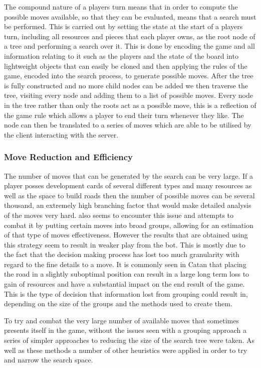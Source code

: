 \documentclass[]{article}
\begin{document}
\par The compound nature of a players turn means that in order to compute the possible moves available, so that they can be evaluated, means that a search must be performed. This is carried out by setting the state at the start of a players turn, including all resources and pieces that each player owns, as the root node of a tree and performing a search over it. This is done by encoding the game and all information relating to it such as the players and the state of the board into lightweight objects that can easily be cloned and then applying the rules of the game, encoded into the search process, to generate possible moves. After the tree is fully constructed and no more child nodes can be added we then traverse the tree, visiting every node and adding them to a list of possible moves. Every node in the tree rather than only the roots act as a possible move, this is a reflection of the game rule which allows a player to end their turn whenever they like. The node can then be translated to a series of moves which are able to be utilised by the client interacting with the server.

\subsubsection{Move Reduction and Efficiency}
The number of moves that can be generated by the search can be very large. If a player posses development cards of several different types and many resources as well as the space to build roads then the number of possible moves can be several thousand, an extremely high branching factor that would make detailed analysis of the moves very hard. \textcite{roelofs2012monte} also seems to encounter this issue and attempts to combat it by putting certain moves into broad groups, allowing for an estimation of that type of moves effectiveness. However the results that are obtained using this strategy seem to result in weaker play from the bot. This is mostly due to the fact that the decision making process has lost too much granularity with regard to the fine details to a move. It is commonly seen in Catan that placing the road in a slightly suboptimal position can result in a large long term loss to gain of resources and have a substantial impact on the end result of the game. This is the type of decision that information lost from grouping could result in, depending on the size of the groups and the methods used to create them.

\par To try and combat the very large number of available moves that sometimes presents itself in the game, without the issues seen with a grouping approach a series of simpler approaches to reducing the size of the search tree were taken. As well as these methods a number of other heuristics were applied in order to try and narrow the search space.
\end{document}

